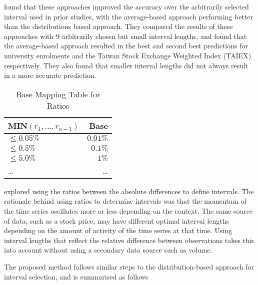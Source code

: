 \documentclass{article}
\theoremstyle{definition}
\begin{document}
\citep{Huarng2001effective} found that these approaches improved the accuracy over the arbitrarily selected interval used in prior studies, with the average-based approach performing better than the distributions based approach. They compared the results of these approaches with 9 arbitrarily chosen but small interval lengths, and found that the average-based approach resulted in the best and second best predictions for university enrolments and the Taiwan Stock Exchange Weighted Index (TAIEX) respectively. They also found that smaller interval lengths did not always result in a more accurate prediction.

\begin{table}[H]
	\center
	\begin{tabularx}{0.5\textwidth}{ X R }
  	MIN$(r_1,\ldots,r_{n-1})$ & Base\\
  	\hline 
  	\noalign{\smallskip}
	$\leq 0.05\%$ & $0.01\%$ \\
	$\leq 0.5\%$ & $0.1\%$ \\
	$\leq 5.0\%$ & $1\%$ \\
	\ldots & \ldots
	\end{tabularx}
	\caption{Base Mapping Table for Ratios}
\end{table}

\cite{huarng2006ratio} explored using the ratios between the absolute differences to define intervals. The rationale behind using ratios to determine intervals was that the momentum of the time series oscillates more or less depending on the context. The same source of data, such as a stock price, may have different optimal interval lengths depending on the amount of activity of the time series at that time. Using interval lengths that reflect the relative difference between observations takes this into account without using a secondary data source such as volume.

The proposed method follows similar steps to the distribution-based approach for interval selection, and is summarised as follows
\end{document}

